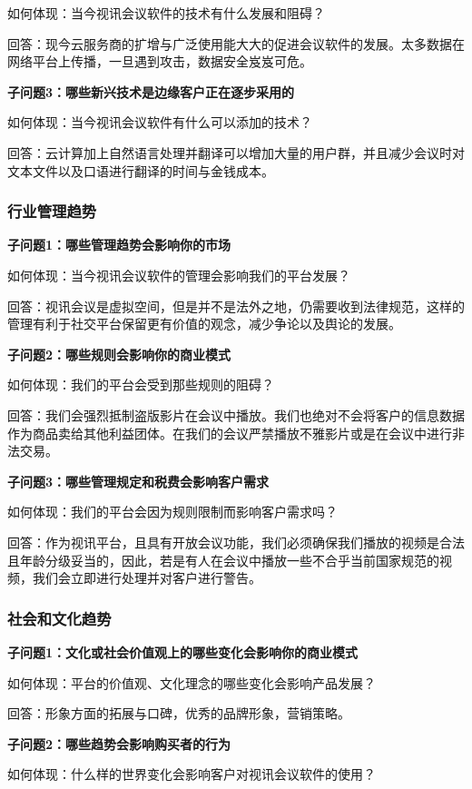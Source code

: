 \documentclass[a4paper,12pt]{article}
\begin{document}
    如何体现：当今视讯会议软件的技术有什么发展和阻碍？

    回答：现今云服务商的扩增与广泛使用能大大的促进会议软件的发展。太多数据在网络平台上传播，一旦遇到攻击，数据安全岌岌可危。

    \textbf{子问题3：哪些新兴技术是边缘客户正在逐步采用的}

    如何体现：当今视讯会议软件有什么可以添加的技术？

    回答：云计算加上自然语言处理并翻译可以增加大量的用户群，并且减少会议时对文本文件以及口语进行翻译的时间与金钱成本。

    \subsubsection{行业管理趋势}
    \textbf{子问题1：哪些管理趋势会影响你的市场}

    如何体现：当今视讯会议软件的管理会影响我们的平台发展？

    回答：视讯会议是虚拟空间，但是并不是法外之地，仍需要收到法律规范，这样的管理有利于社交平台保留更有价值的观念，减少争论以及舆论的发展。
    
    \textbf{子问题2：哪些规则会影响你的商业模式}

    如何体现：我们的平台会受到那些规则的阻碍？

    回答：我们会强烈抵制盗版影片在会议中播放。我们也绝对不会将客户的信息数据作为商品卖给其他利益团体。在我们的会议严禁播放不雅影片或是在会议中进行非法交易。

    \textbf{子问题3：哪些管理规定和税费会影响客户需求}

    如何体现：我们的平台会因为规则限制而影响客户需求吗？

    回答：作为视讯平台，且具有开放会议功能，我们必须确保我们播放的视频是合法且年龄分级妥当的，因此，若是有人在会议中播放一些不合乎当前国家规范的视频，我们会立即进行处理并对客户进行警告。

    \subsubsection{社会和文化趋势}    
    \textbf{子问题1：文化或社会价值观上的哪些变化会影响你的商业模式}

    如何体现：平台的价值观、文化理念的哪些变化会影响产品发展？

    回答：形象方面的拓展与口碑，优秀的品牌形象，营销策略。

    \textbf{子问题2：哪些趋势会影响购买者的行为}

    如何体现：什么样的世界变化会影响客户对视讯会议软件的使用？
\end{document}

